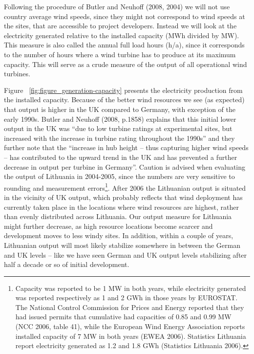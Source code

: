 \documentclass[a4paper, 12pt]{article}
\begin{document}
Following the procedure of Butler and Neuhoff (2008, 2004) we will not use country average wind speeds, since they might not correspond to wind speeds at the sites, that are accessible to project developers. Instead we will look at the electricity generated relative to the installed capacity (MWh divided by MW). This measure is also called the annual full load hours (h/a), since it corresponds to the number of hours where a wind turbine has to produce at its maximum capacity. This will serve as a crude measure of the output of all operational wind turbines. 

Figure ~\ref{fig:figure_generation-capacity} presents the electricity production from the installed capacity. Because of the better wind resources we see (as expected) that output is higher in the UK compared to Germany, with exception of the early 1990s. Butler and Neuhoff (2008, p.1858) explains that this initial lower output in the UK was ``due to low turbine ratings at experimental sites, but increased with the increase in turbine rating throughout the 1990s'' and they further note that the ``increase in hub height – thus capturing higher wind speeds – has contributed to the upward trend in the UK and has prevented a further decrease in output per turbine in Germany''. Caution is advised when evaluating the output of Lithuania in 2004-2005, since the numbers are very sensitive to rounding and measurement errors\footnote{Capacity was reported to be 1 MW in both years, while electricity generated was reported respectively as 1 and 2 GWh in those years by EUROSTAT. The National Control Commission for Prices and Energy reported that they had issued permits that cumulative had capacities of 0.85 and 0.99 MW (NCC 2006, table 41), while the European Wind Energy Association reports installed capacity of 7 MW in both years (EWEA 2006). Statistics Lithuania report electricity generated as 1.2 and 1.8 GWh (Statistics Lithuania 2006).}. After 2006 the Lithuanian output is situated in the vicinity of UK output, which probably reflects that wind deployment has currently taken place in the locations where wind resources are highest, rather than evenly distributed across Lithuania. Our output measure for Lithuania might further decrease, as high resource locations become scarcer and development moves to less windy sites. In addition, within a couple of years, Lithuanian output will most likely stabilize somewhere in between the German and UK levels – like we have seen German and UK output levels stabilizing after half a decade or so of initial development. 
\end{document}
